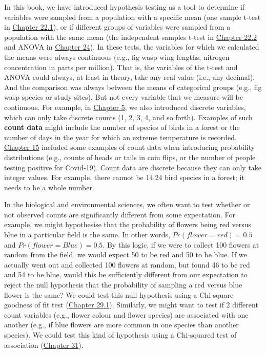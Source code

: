 \documentclass[
]{scrbook}
\begin{document}
In this book, we have introduced hypothesis testing as a tool to determine if variables were sampled from a population with a specific mean (one sample t-test in \protect\hyperlink{one-sample-t-test}{Chapter 22.1}), or if different groups of variables were sampled from a population with the same mean (the independent samples t-test in \protect\hyperlink{independent-samples-t-test}{Chapter 22.2} and ANOVA in \protect\hyperlink{Chapter_24}{Chapter 24}).
In these tests, the variables for which we calculated the means were always continuous (e.g., fig wasp wing lengths, nitrogen concentration in parts per million).
That is, the variables of the t-test and ANOVA could always, at least in theory, take any real value (i.e., any decimal).
And the comparison was always between the means of categorical groups (e.g., fig wasp species or study sites).
But not every variable that we measure will be continuous.
For example, in \protect\hyperlink{Chapter_5}{Chapter 5}, we also introduced discrete variables, which can only take discrete counts (1, 2, 3, 4, and so forth).
Examples of such \textbf{count data} might include the number of species of birds in a forest or the number of days in the year for which an extreme temperature is recorded.
\protect\hyperlink{Chapter_15}{Chapter 15} included some examples of count data when introducing probability distributions (e.g., counts of heads or tails in coin flips, or the number of people testing positive for Covid-19).
Count data are discrete because they can only take integer values.
For example, there cannot be 14.24 bird species in a forest; it needs to be a whole number.

In the biological and environmental sciences, we often want to test whether or not observed counts are significantly different from some expectation.
For example, we might hypothesise that the probability of flowers being red versus blue in a particular field is the same.
In other words, \(Pr(flower = red) = 0.5\) and \(Pr(flower = Blue) = 0.5\).
By this logic, if we were to collect 100 flowers at random from the field, we would expect 50 to be red and 50 to be blue.
If we actually went out and collected 100 flowers at random, but found 46 to be red and 54 to be blue, would this be sufficiently different from our expectation to reject the null hypothesis that the probability of sampling a red versus blue flower is the same?
We could test this null hypothesis using a Chi-square goodness of fit test (\protect\hyperlink{the-chi-square-distribution}{Chapter 29.1}).
Similarly, we might want to test if 2 different count variables (e.g., flower colour and flower species) are associated with one another (e.g., if blue flowers are more common in one species than another species).
We could test this kind of hypothesis using a Chi-squared test of association (\protect\hyperlink{Chapter_31}{Chapter 31}).
\end{document}
